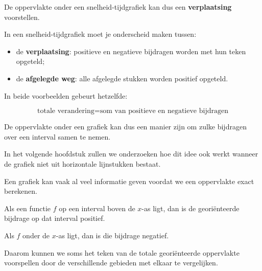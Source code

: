 \documentclass{ximera}
\begin{document}
\begin{voorbeeld}
De oppervlakte onder een snelheid-tijdgrafiek kan dus een
\textbf{verplaatsing} voorstellen.

\begin{opmerking}
In een snelheid-tijdgrafiek moet je onderscheid maken tussen:

\begin{itemize}
    \item de \textbf{verplaatsing}: positieve en negatieve bijdragen
    worden met hun teken opgeteld;

    \item de \textbf{afgelegde weg}: alle afgelegde stukken worden
    positief opgeteld.
\end{itemize}
\end{opmerking}

\end{voorbeeld}



\begin{opmerking}
In beide voorbeelden gebeurt hetzelfde:

\[
\boxed{
\text{totale verandering}
=
\text{som van positieve en negatieve bijdragen}
}
\]

De oppervlakte onder een grafiek kan dus een manier zijn om zulke
bijdragen over een interval samen te nemen.

In het volgende hoofdstuk zullen we onderzoeken hoe dit idee ook werkt
wanneer de grafiek niet uit horizontale lijnstukken bestaat.
\end{opmerking}




Een grafiek kan vaak al veel informatie geven voordat we een oppervlakte
exact berekenen.

Als een functie \(f\) op een interval boven de \(x\)-as ligt, dan is de
georiënteerde bijdrage op dat interval positief.

Als \(f\) onder de \(x\)-as ligt, dan is die bijdrage negatief.

Daarom kunnen we soms het teken van de totale georiënteerde oppervlakte
voorspellen door de verschillende gebieden met elkaar te vergelijken.
\end{document}
